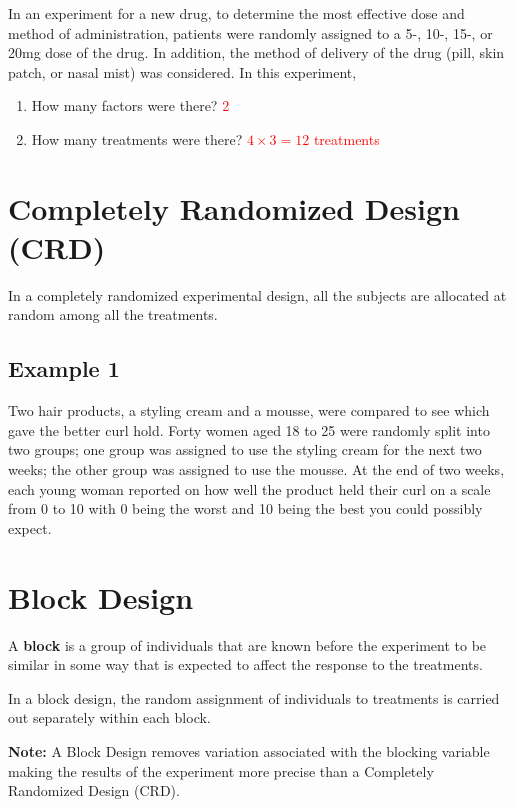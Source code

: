 In an experiment for a new drug, to determine the most effective dose and method of administration, patients were randomly assigned to a 5-, 10-, 15-, or 20mg dose of the drug. In addition, the method of delivery of the drug (pill, skin patch, or nasal mist) was considered. In this experiment,

\begin{enumerate}
    \item How many factors were there? \textcolor{red}{2}
    \item How many treatments were there? \textcolor{red}{$4 \times 3 = 12$ treatments}
\end{enumerate}


\section{Completely Randomized Design (CRD)}

In a completely randomized experimental design, all the subjects are allocated at random among all the treatments.

\subsection*{Example 1}
Two hair products, a styling cream and a mousse, were compared to see which gave the better curl hold. Forty women aged 18 to 25 were randomly split into two groups; one group was assigned to use the styling cream for the next two weeks; the other group was assigned to use the mousse. At the end of two weeks, each young woman reported on how well the product held their curl on a scale from 0 to 10 with 0 being the worst and 10 being the best you could possibly expect.

\section{Block Design}

A \textbf{block} is a group of individuals that are known before the experiment to be similar in some way that is expected to affect the response to the treatments.

In a block design, the random assignment of individuals to treatments is carried out separately within each block.

\textbf{Note:} A Block Design removes variation associated with the blocking variable making the results of the experiment more precise than a Completely Randomized Design (CRD). 

